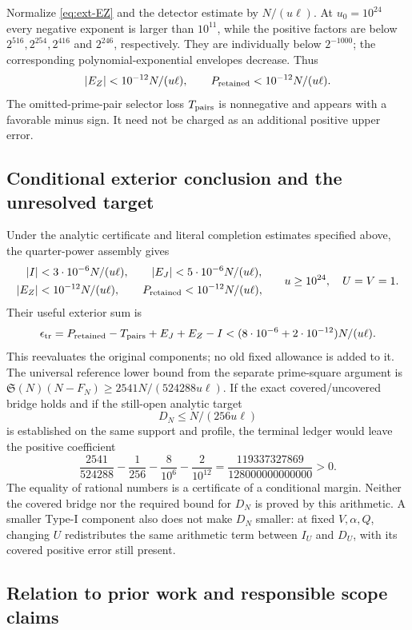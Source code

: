 \documentclass[11pt,a4paper]{article}
\theoremstyle{definition}
\theoremstyle{remark}
\begin{document}
Normalize \eqref{eq:ext-EZ} and the detector estimate by $N/(u\ell)$.
At $u_0=10^{24}$ every negative exponent is larger than $10^{11}$,
while the positive factors are below $2^{516},2^{254},2^{416}$ and
$2^{246}$, respectively. They are individually below $2^{-1000}$;
the corresponding polynomial-exponential envelopes decrease.
Thus
\[
 |E_Z|<10^{-12}N/(u\ell),\qquad
 P_{\rm retained}<10^{-12}N/(u\ell).
\]
The omitted-prime-pair selector loss $T_{\rm pairs}$ is nonnegative
and appears with a favorable minus sign. It need not be charged as
an additional positive upper error.

\subsection{Conditional exterior conclusion and the unresolved target}

Under the analytic certificate and literal completion estimates
specified above, the quarter-power assembly gives
\begin{equation}\label{eq:ext-final}
 \begin{split}
 |I|&<3\cdot10^{-6}N/(u\ell),\qquad
 |E_J|<5\cdot10^{-6}N/(u\ell),\\
 |E_Z|&<10^{-12}N/(u\ell),\qquad
 P_{\rm retained}<10^{-12}N/(u\ell),
 \end{split}\qquad u\geq10^{24},\quad U=V=1.
\end{equation}
Their useful exterior sum is
\[
 \epsilon_{\rm tr}=P_{\rm retained}-T_{\rm pairs}+E_J+E_Z-I
   <(8\cdot10^{-6}+2\cdot10^{-12})N/(u\ell).
\]
This reevaluates the original components; no old fixed allowance is added
to it. The universal reference lower bound from the separate prime-square
argument is
$\mathfrak S(N)(N-F_N)\geq2541N/(524288u\ell)$.
If the exact covered/uncovered bridge holds and if the still-open
analytic target
\[
             D_N\leq N/(256u\ell)
\]
is established on the same support and profile, the terminal ledger
would leave the positive coefficient
\[
 \frac{2541}{524288}-\frac1{256}
                  -\frac8{10^6}-\frac2{10^{12}}
       =\frac{119337327869}{128000000000000}>0.
\]
The equality of rational numbers is a certificate of a conditional
margin. Neither the covered bridge nor the required bound for $D_N$
is proved by this arithmetic. A smaller Type-I component also does not
make $D_N$ smaller: at fixed $V,\alpha,Q$, changing $U$ redistributes
the same arithmetic term between $I_U$ and $D_U$, with its covered
positive error still present.

\subsection{Relation to prior work and responsible scope claims}
\end{document}

